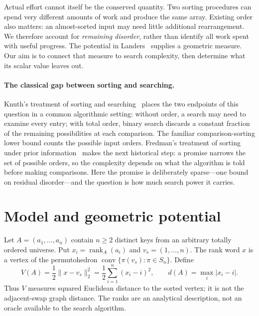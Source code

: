 \documentclass[10pt,letterpaper]{article}
\newcommand{\rank}{\operatorname{rank}}
\begin{document}
Actual effort cannot itself be the conserved quantity. Two sorting procedures can spend
very different amounts of work and produce the same array. Existing order also matters:
an almost-sorted input may need little additional rearrangement. We therefore account for
\emph{remaining disorder}, rather than identify all work spent with useful progress.
The potential in Landers~\cite{landers} supplies a geometric measure. Our aim is to connect
that measure to search complexity, then determine what its scalar value leaves out.

\paragraph{The classical gap between sorting and searching.}
Knuth's treatment of sorting and searching~\cite{knuth} places the two endpoints
of this question in a common algorithmic setting: without order, a search may need
to examine every entry; with total order, binary search discards a constant fraction
of the remaining possibilities at each comparison. The familiar comparison-sorting
lower bound counts the possible input orders. Fredman's treatment of sorting under
prior information~\cite{fredman} makes the next historical step: a promise narrows
the set of possible orders, so the complexity depends on what the algorithm is
told before making comparisons. Here the promise is deliberately sparse---one
bound on residual disorder---and the question is how much search power it carries.

\section{Model and geometric potential}
Let $A=(a_1,\ldots,a_n)$ contain $n\geq2$ distinct keys from an arbitrary totally ordered
universe. Put $x_i=\rank_A(a_i)$ and $v_s=(1,\ldots,n)$. The rank word $x$ is a vertex of
the permutohedron $\operatorname{conv}\{\pi(v_s):\pi\in S_n\}$. Define
\begin{equation}
 V(A)=\frac12\|x-v_s\|_2^2=\frac12\sum_{i=1}^n(x_i-i)^2,
 \qquad d(A)=\max_i|x_i-i|. \label{eq:potential}
\end{equation}
Thus $V$ measures squared Euclidean distance to the sorted vertex; it is not the
adjacent-swap graph distance. The ranks are an analytical description, not an oracle
available to the search algorithm.
\end{document}
